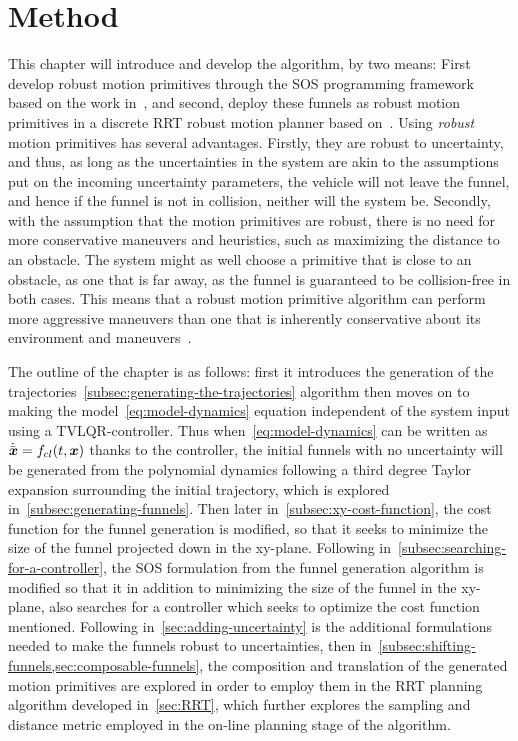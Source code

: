 \chapter{Method}
\label{chp:method}

This chapter will introduce and develop the \rrtfunnel{} algorithm, by two
means: First develop robust motion primitives through the \ac{SOS} programming
framework based on the work in~\cite{majumdarFunnelLibrariesRealtime2017}, and
second, deploy these funnels as robust motion primitives in a discrete \ac{RRT}
robust motion planner based on~\cite{lavalleLav98cPdf}. Using \textit{robust}
motion primitives has several advantages. Firstly, they are robust to
uncertainty, and thus, as long as the uncertainties in the system are akin to
the assumptions put on the incoming uncertainty parameters, the vehicle will not
leave the funnel, and hence if the funnel is not in collision, neither will the
system be. Secondly, with the assumption that the motion primitives are robust,
there is no need for more conservative maneuvers and heuristics, such as
maximizing the distance to an obstacle. The system might as well choose a
primitive that is close to an obstacle, as one that is far away, as the funnel
is guaranteed to be collision-free in both cases. This means that a robust
motion primitive algorithm can perform more aggressive maneuvers than one that
is inherently conservative about its environment and
maneuvers~\cite{singhRobustOnlineMotion2017}.

The outline of the chapter is as follows: first it introduces the generation of
the trajectories~\cref{subsec:generating-the-trajectories} algorithm then moves
on to making the model~\cref{eq:model-dynamics} equation independent of the
system input using a \ac{TVLQR}-controller. Thus when~\cref{eq:model-dynamics}
can be written as \(\dot{\bar{\boldsymbol{x}}} = f_{cl}(t,\boldsymbol{x})\) thanks to the
controller, the initial funnels with no uncertainty will be generated from the
polynomial dynamics following a third degree Taylor expansion surrounding the
initial trajectory, which is explored in~\cref{subsec:generating-funnels}. Then
later in~\cref{subsec:xy-cost-function}, the cost function for the funnel
generation is modified, so that it seeks to minimize the size of the funnel
projected down in the xy-plane. Following
in~\cref{subsec:searching-for-a-controller}, the \ac{SOS} formulation from the
funnel generation algorithm is modified so that it in addition to minimizing the
size of the funnel in the xy-plane, also searches for a controller which seeks
to optimize the cost function mentioned. Following
in~\cref{sec:adding-uncertainty} is the additional formulations needed to make
the funnels robust to uncertainties, then
in~\cref{subsec:shifting-funnels,sec:composable-funnels}, the composition and
translation of the generated motion primitives are explored in order to employ
them in the \ac{RRT} planning algorithm developed in~\cref{sec:RRT}, which
further explores the sampling and distance metric employed in the on-line
planning stage of the algorithm.

